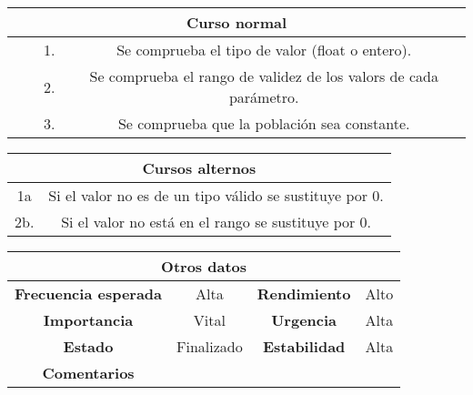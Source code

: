 \begin{table}[!h]
\begin{tabular}{|c|c|c|c|}
\hline
\multicolumn{4}{|c|}{\cellcolor{cyan} \textbf{Curso normal}} \\
\hline
              &               &      1.        &    Se comprueba el tipo de valor (float o entero).         \\
\hline
              &               &      2.        &    Se  comprueba el rango de validez de los valors de cada parámetro.         \\
\hline
              &               &      3.        &    Se comprueba que la población sea constante.          \\
\hline
\end{tabular}
\end{table}

\begin{table}[!h]
\begin{tabular}{|c|c|}
\hline
\multicolumn{2}{|c|}{\cellcolor{cyan} \textbf{Cursos alternos}} \\
\hline
        1a       &     Si el valor no es de un tipo válido se sustituye por 0. \\
\hline
        2b.      &     Si el valor no está en el rango se sustituye por 0.         \\
\hline

\end{tabular}
\end{table}

\begin{table}[!h]
\begin{tabular}{|c|c|c|c|}
\hline
\multicolumn{4}{|c|}{\cellcolor{cyan} \textbf{Otros datos}} \\
\hline
 \cellcolor{cyan} \textbf{Frecuencia esperada}             &      Alta         &    \cellcolor{cyan} \textbf{Rendimiento}          &      Alto        \\
\hline
 \cellcolor{cyan} \textbf{Importancia}             &      Vital         &     \cellcolor{cyan} \textbf{Urgencia}         &      Alta        \\
\hline
 \cellcolor{cyan} \textbf{Estado}             &       Finalizado        &    \cellcolor{cyan} \textbf{Estabilidad}          &    Alta          \\
\hline
 \cellcolor{cyan} \textbf{Comentarios}        &  \multicolumn{3}{|c|}{} \\
\hline
\end{tabular}
\end{table}






